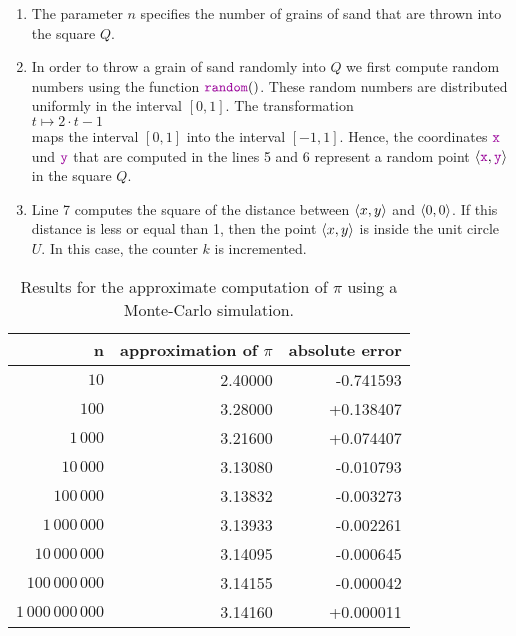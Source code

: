 \begin{enumerate}
\item The parameter $n$ specifies the number of grains of sand that are thrown into the square $Q$.
\item In order to throw a grain of sand randomly into $Q$ we first compute random numbers using the function
      $\mytt{random}()$.  These random numbers are distributed uniformly in the interval  $[0,1]$.   The
      transformation  
      \\[0.2cm]
      \hspace*{1.3cm}
      $t \mapsto 2 \cdot t - 1$
      \\[0.2cm]
      maps the interval $[0,1]$ into the interval $[-1, 1]$.  Hence, the coordinates $\mytt{x}$ und
      $\mytt{y}$ that are computed in the lines 5 and 6 represent a random point $\pair(\mytt{x}, \mytt{y})$ 
      in the square $Q$.
\item Line  7 computes the square of the distance between $\pair(x,y)$ and $\pair(0,0)$.  If this distance is
      less or equal than 1, then the point $\pair(x,y)$ is inside the unit circle $U$.  In this case, the counter $k$ is incremented.
\end{enumerate}

\begin{table}[htbp]
  \label{tab:pi}
  \centering
  \begin{tabular}[t]{|r|r|r|}
  \hline
  n & approximation of $\pi$ & absolute error \\
  \hline
  \hline
               $10$ & 2.40000 & -0.741593 \\
\hline
              $100$ & 3.28000 & +0.138407 \\
\hline
           $1\,000$ & 3.21600 & +0.074407 \\
\hline
          $10\,000$ & 3.13080 & -0.010793 \\
\hline
         $100\,000$ & 3.13832 & -0.003273 \\
\hline
      $1\,000\,000$ & 3.13933 & -0.002261 \\
\hline
     $10\,000\,000$ & 3.14095 & -0.000645 \\
\hline
    $100\,000\,000$ & 3.14155 & -0.000042 \\
\hline
 $1\,000\,000\,000$ & 3.14160 & +0.000011 \\
\hline
  \end{tabular}
  \caption{Results for the approximate computation of $\pi$ using a Monte-Carlo simulation.}
\end{table}

